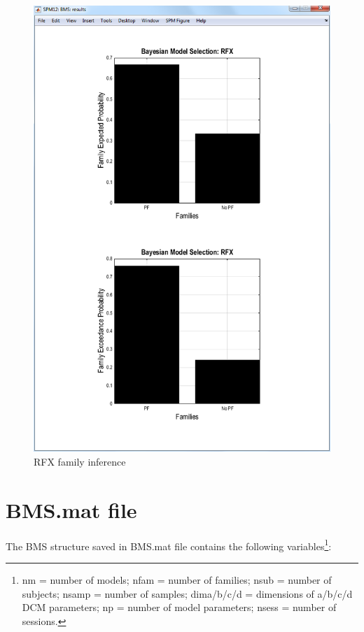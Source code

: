 \begin{figure}
\begin{center}
\includegraphics[width=150mm]{bms/Slide6.png}
\caption{RFX family inference\label{rfx_family}}
\end{center}
\end{figure}

\section{BMS.mat file}

The BMS structure saved in BMS.mat file contains the following variables\footnote{nm = number of models; nfam = number of families; nsub = number of subjects; nsamp = number of samples; dima/b/c/d = dimensions of a/b/c/d DCM parameters; np = number of model parameters; nsess = number of sessions.}:


